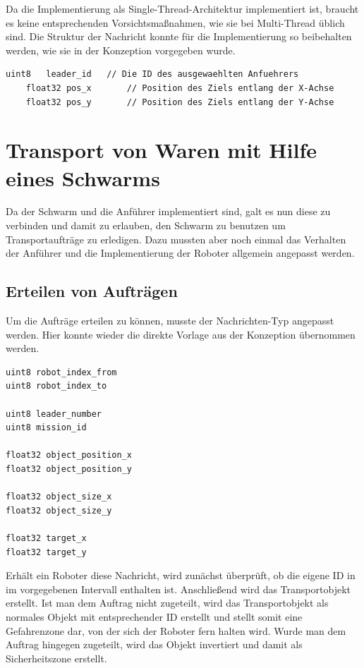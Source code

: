 Da die Implementierung als Single-Thread-Architektur implementiert ist, braucht es keine entsprechenden Vorsichtsmaßnahmen, wie sie bei Multi-Thread üblich sind.
Die Struktur der Nachricht konnte für die Implementierung so beibehalten werden, wie sie in der Konzeption vorgegeben wurde.

\begin{lstlisting}[style=ros, title=Nachrichten-Typ: New\_Mission]
	uint8	leader_id	// Die ID des ausgewaehlten Anfuehrers
	float32 pos_x		// Position des Ziels entlang der X-Achse
	float32 pos_y		// Position des Ziels entlang der Y-Achse
\end{lstlisting}









\section{Transport von Waren mit Hilfe eines Schwarms}

Da der Schwarm und die Anführer implementiert sind, galt es nun diese zu verbinden und damit zu erlauben, den Schwarm zu benutzen um Transportaufträge zu erledigen. Dazu mussten aber noch einmal das Verhalten der Anführer und die Implementierung der Roboter allgemein angepasst werden.

\subsection*{Erteilen von Aufträgen}

Um die Aufträge erteilen zu können, musste der Nachrichten-Typ angepasst werden. Hier konnte wieder die direkte Vorlage aus der Konzeption übernommen werden.

\begin{lstlisting}[style=ros, title=Nachrichten-Typ: New\_Mission]
uint8 robot_index_from
uint8 robot_index_to

uint8 leader_number
uint8 mission_id

float32 object_position_x
float32 object_position_y

float32 object_size_x
float32 object_size_y

float32 target_x
float32 target_y
\end{lstlisting}

Erhält ein Roboter diese Nachricht, wird zunächst überprüft, ob die eigene ID in im vorgegebenen Intervall enthalten ist. Anschließend wird das Transportobjekt erstellt. Ist man dem Auftrag nicht zugeteilt, wird das Transportobjekt als normales Objekt mit entsprechender ID erstellt und stellt somit eine Gefahrenzone dar, von der sich der Roboter fern halten wird.
Wurde man dem Auftrag hingegen zugeteilt, wird das Objekt invertiert und damit als Sicherheitszone erstellt.

